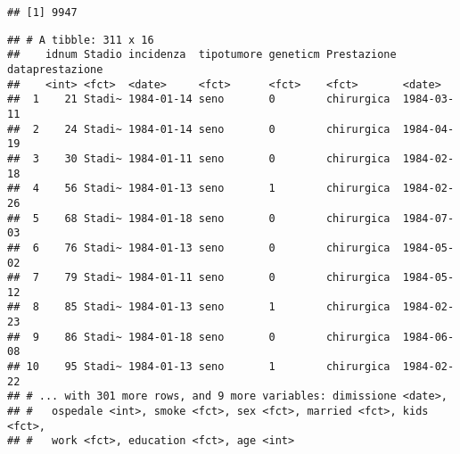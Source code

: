 \documentclass[]{article}
\newenvironment{Shaded}{\begin{snugshade}}{\end{snugshade}}
\newcommand{\DataTypeTok}[1]{\textcolor[rgb]{0.13,0.29,0.53}{#1}}
\newcommand{\KeywordTok}[1]{\textcolor[rgb]{0.13,0.29,0.53}{\textbf{#1}}}
\newcommand{\NormalTok}[1]{#1}
\newcommand{\OperatorTok}[1]{\textcolor[rgb]{0.81,0.36,0.00}{\textbf{#1}}}
\newcommand{\StringTok}[1]{\textcolor[rgb]{0.31,0.60,0.02}{#1}}
\begin{document}
\begin{verbatim}
## [1] 9947
\end{verbatim}

\begin{Shaded}
\end{Shaded}

\begin{verbatim}
## # A tibble: 311 x 16
##    idnum Stadio incidenza  tipotumore geneticm Prestazione dataprestazione
##    <int> <fct>  <date>     <fct>      <fct>    <fct>       <date>         
##  1    21 Stadi~ 1984-01-14 seno       0        chirurgica  1984-03-11     
##  2    24 Stadi~ 1984-01-14 seno       0        chirurgica  1984-04-19     
##  3    30 Stadi~ 1984-01-11 seno       0        chirurgica  1984-02-18     
##  4    56 Stadi~ 1984-01-13 seno       1        chirurgica  1984-02-26     
##  5    68 Stadi~ 1984-01-18 seno       0        chirurgica  1984-07-03     
##  6    76 Stadi~ 1984-01-13 seno       0        chirurgica  1984-05-02     
##  7    79 Stadi~ 1984-01-11 seno       0        chirurgica  1984-05-12     
##  8    85 Stadi~ 1984-01-13 seno       1        chirurgica  1984-02-23     
##  9    86 Stadi~ 1984-01-18 seno       0        chirurgica  1984-06-08     
## 10    95 Stadi~ 1984-01-13 seno       1        chirurgica  1984-02-22     
## # ... with 301 more rows, and 9 more variables: dimissione <date>,
## #   ospedale <int>, smoke <fct>, sex <fct>, married <fct>, kids <fct>,
## #   work <fct>, education <fct>, age <int>
\end{verbatim}
\end{document}
